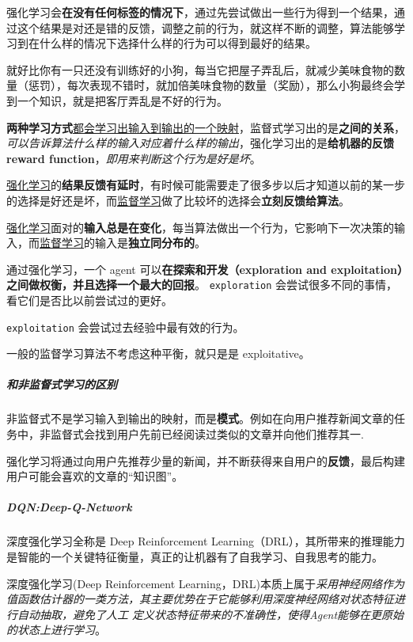 \documentclass[UTF8,a4paper,12pt]{ctexbook}
\begin{document}
					强化学习会\textbf{在没有任何标签的情况下}，通过先尝试做出一些行为得到一个结果，通过这个结果是对还是错的反馈，调整之前的行为，就这样不断的调整，算法能够学习到在什么样的情况下选择什么样的行为可以得到最好的结果。
					
					就好比你有一只还没有训练好的小狗，每当它把屋子弄乱后，就减少美味食物的数量（惩罚），每次表现不错时，就加倍美味食物的数量（奖励），那么小狗最终会学到一个知识，就是把客厅弄乱是不好的行为。
					
					\textbf{两种学习方式}\underline{都会学习出输入到输出的一个映射}，监督式学习出的是\textbf{之间的关系}，\textit{可以告诉算法什么样的输入对应着什么样的输出}，强化学习出的是\textbf{给机器的反馈 reward function}，\textit{即用来判断这个行为是好是坏}。
					
					\underline{强化学习}的\textbf{结果反馈有延时}，有时候可能需要走了很多步以后才知道以前的某一步的选择是好还是坏，而\underline{监督学习}做了比较坏的选择会\textbf{立刻反馈给算法}。
					
					\underline{强化学习}面对的\textbf{输入总是在变化}，每当算法做出一个行为，它影响下一次决策的输入，而\underline{监督学习}的输入是\textbf{独立同分布的}。
					
					通过强化学习，一个 agent 可以\textbf{在探索和开发（exploration and exploitation）之间做权衡，并且选择一个最大的回报}。 
					\verb|exploration| 会尝试很多不同的事情，看它们是否比以前尝试过的更好。 
					
					\verb|exploitation| 会尝试过去经验中最有效的行为。
					
					一般的监督学习算法不考虑这种平衡，就只是是 exploitative。
					
					
				\subparagraph{和非监督式学习的区别}
					非监督式不是学习输入到输出的映射，而是\textbf{模式}。例如在向用户推荐新闻文章的任务中，非监督式会找到用户先前已经阅读过类似的文章并向他们推荐其一.
					
					强化学习将通过向用户先推荐少量的新闻，并不断获得来自用户的\textbf{反馈}，最后构建用户可能会喜欢的文章的“知识图”。
				
				
				\subparagraph{DQN:Deep-Q-Network}
					深度强化学习全称是 Deep Reinforcement Learning（DRL），其所带来的推理能力 是智能的一个关键特征衡量，真正的让机器有了自我学习、自我思考的能力。
					
					深度强化学习(Deep Reinforcement Learning，DRL)本质上属于\textit{采用神经网络作为值函数估计器的一类方法，其主要优势在于它能够利用深度神经网络对状态特征进行自动抽取，避免了人工 定义状态特征带来的不准确性，使得Agent能够在更原始的状态上进行学习}。
				
\end{document}

